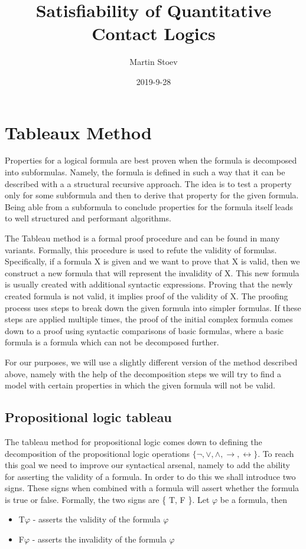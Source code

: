 \documentclass{article}
\title{Satisfiability of Quantitative Contact Logics}
\date{2019-9-28}
\author{Martin Stoev}
\begin{document}
	\maketitle
 	\thispagestyle{empty}
	\newpage

	\tableofcontents

	\newpage
	\section{Tableaux Method}
Properties for a logical formula are best proven when the formula is decomposed into subformulas. Namely, the formula is defined in such a way that it can be described with a a structural recursive approach. The idea is to test a property only for some subformula and then to derive that property for the given formula.
Being able from a subformula to conclude properties for the formula itself leads to well structured and performant algorithms.

The Tableau method is a formal proof procedure and can be found in many variants. Formally, this procedure is used to refute the validity of formulas. Specifically, if a formula X is given and we want to prove that X is valid, then we construct a new formula that will represent the invalidity of X. This new formula is usually created with additional syntactic expressions. Proving that the newly created formula is not valid, it implies proof of the validity of X. The proofing process uses steps to break down the given formula into simpler formulas. If these steps are applied multiple times, the proof of the initial complex formula comes down to a proof using syntactic comparisons of basic formulas, where a basic formula is a formula which can not be decomposed further.

For our purposes, we will use a slightly different version of the method described above, namely with the help of the decomposition steps we will try to find a model with certain properties in which the given formula will not be valid.

		\subsection{Propositional logic tableau}
The tableau method for propositional logic comes down to defining the decomposition of the propositional logic operations $\{ \neg, \vee, \wedge, \rightarrow, \leftrightarrow \}$. To reach this goal we need to improve our syntactical arsenal, namely to add the ability for asserting the validity of a formula. In order to do this we shall introduce two signs. These signs when combined with a formula will assert whether the formula is true or false. Formally, the two signs are \{ T, F \}. Let $\varphi$ be a formula, then
\begin{itemize}
	\item T$\varphi$ - asserts the validity of the formula $\varphi$
	\item F$\varphi$ - asserts the invalidity of the formula $\varphi$
\end{itemize} 
\end{document}
